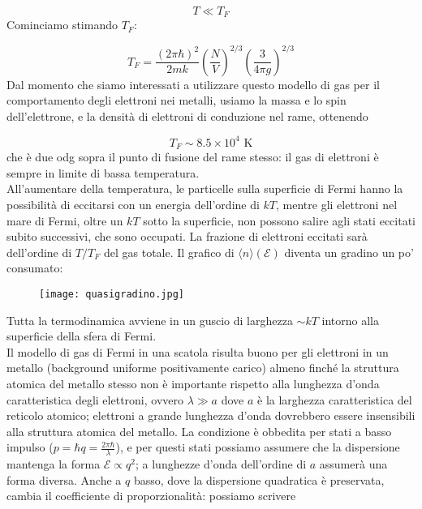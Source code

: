 \documentclass[a4paper]{report}
\begin{document}
\begin{equation}
    T \ll T_F
\end{equation}
Cominciamo stimando $T_F$:

\begin{equation}
    T_F = \frac{(2\pi\hbar)^2}{2 m k} \left(\frac{N}{V}\right)^{2/3}\left(\frac{3}{4\pi g}\right)^{2/3}
\end{equation}
Dal momento che siamo interessati a utilizzare questo modello di gas per il comportamento degli elettroni nei metalli, usiamo la massa e lo spin dell'elettrone, e la densità di elettroni di conduzione nel rame, ottenendo

\begin{equation}
    T_F \sim 8.5 \times 10^4 \,\,\text{K}
\end{equation}
che è due odg sopra il punto di fusione del rame stesso: il gas di elettroni è sempre in limite di bassa temperatura.\\
All'aumentare della temperatura, le particelle sulla superficie di Fermi hanno la possibilità di eccitarsi con un energia dell'ordine di $k T$, mentre gli elettroni nel mare di Fermi, oltre un $k T$ sotto la superficie, non possono salire agli stati eccitati subito successivi, che sono occupati. La frazione di elettroni eccitati sarà dell'ordine di $T/T_F$ del gas totale. Il grafico di $\langle n\rangle(\mathcal{E})$ diventa un gradino un po' consumato:

\begin{figure}[h!]
    \centering
    \texttt{[image: quasigradino.jpg]}
    \label{fig:my_label}
\end{figure}
Tutta la termodinamica avviene in un guscio di larghezza $\sim k T$ intorno alla superficie della sfera di Fermi. \\
Il modello di gas di Fermi in una scatola risulta buono per gli elettroni in un metallo (background uniforme positivamente carico) almeno finché la struttura atomica del metallo stesso non è importante rispetto alla lunghezza d'onda caratteristica degli elettroni, ovvero $\lambda\gg a$ dove $a$ è la larghezza caratteristica del reticolo atomico; elettroni a grande lunghezza d'onda dovrebbero essere insensibili alla struttura atomica del metallo. La condizione è obbedita per stati a basso impulso ($ p = \hbar q = \frac{2\pi\hbar}{\lambda}$), e per questi stati possiamo assumere che la dispersione mantenga la forma $\mathcal{E}\propto q^2$; a lunghezze d'onda dell'ordine di $a$ assumerà una forma diversa. Anche a $q$ basso, dove la dispersione quadratica è preservata, cambia il coefficiente di proporzionalità: possiamo scrivere
\end{document}
